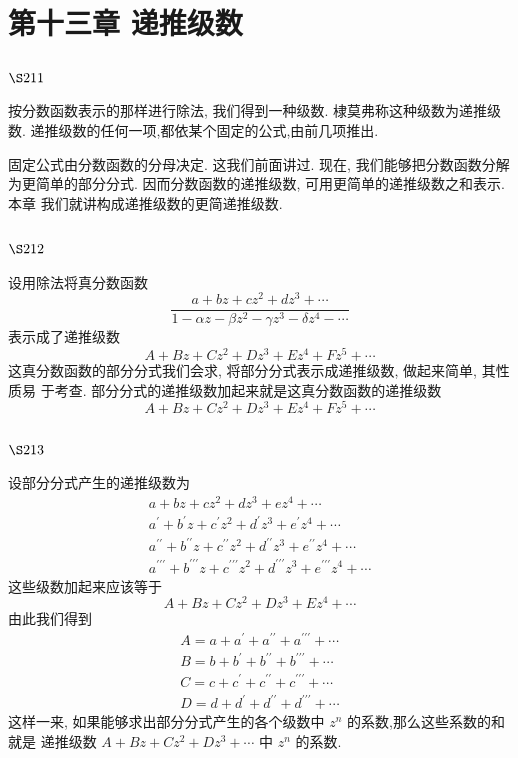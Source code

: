 \chapter{第十三章 递推级数}

\section{$\S 211$}

按分数函数表示的那样进行除法, 我们得到一种级数. 棣莫弗称这种级数为递推级 数. 递推级数的任何一项,都依某个固定的公式,由前几项推出.

固定公式由分数函数的分母决定. 这我们前面讲过. 现在, 我们能够把分数函数分解 为更简单的部分分式. 因而分数函数的递推级数, 可用更简单的递推级数之和表示. 本章 我们就讲构成递推级数的更简递推级数.

\section{$\S 212$}

设用除法将真分数函数
\[
\frac{a+b z+c z^{2}+d z^{3}+\cdots}{1-\alpha z-\beta z^{2}-\gamma z^{3}-\delta z^{4}-\cdots}
\]
表示成了递推级数
\[
A+B z+C z^{2}+D z^{3}+E z^{4}+F z^{5}+\cdots
\]
这真分数函数的部分分式我们会求, 将部分分式表示成递推级数, 做起来简单, 其性质易 于考查. 部分分式的递推级数加起来就是这真分数函数的递推级数
\[
A+B z+C z^{2}+D z^{3}+E z^{4}+F z^{5}+\cdots
\]
\section{$\S 213$}

设部分分式产生的递推级数为
\[
\begin{gathered}
a+b z+c z^{2}+d z^{3}+e z^{4}+\cdots \\
a^{\prime}+b^{\prime} z+c^{\prime} z^{2}+d^{\prime} z^{3}+e^{\prime} z^{4}+\cdots \\
a^{\prime \prime}+b^{\prime \prime} z+c^{\prime \prime} z^{2}+d^{\prime \prime} z^{3}+e^{\prime \prime} z^{4}+\cdots \\
a^{\prime \prime \prime}+b^{\prime \prime \prime} z+c^{\prime \prime \prime} z^{2}+d^{\prime \prime \prime} z^{3}+e^{\prime \prime \prime} z^{4}+\cdots
\end{gathered}
\]
这些级数加起来应该等于 
\[
A+B z+C z^{2}+D z^{3}+E z^{4}+\cdots
\]
由此我们得到
\[
\begin{gathered}
A=a+a^{\prime}+a^{\prime \prime}+a^{\prime \prime \prime}+\cdots \\
B=b+b^{\prime}+b^{\prime \prime}+b^{\prime \prime \prime}+\cdots \\
C=c+c^{\prime}+c^{\prime \prime}+c^{\prime \prime \prime}+\cdots \\
D=d+d^{\prime}+d^{\prime \prime}+d^{\prime \prime \prime}+\cdots
\end{gathered}
\]
这样一来, 如果能够求出部分分式产生的各个级数中 $z^{n}$ 的系数,那么这些系数的和就是 递推级数 $A+B z+C z^{2}+D z^{3}+\cdots$ 中 $z^{n}$ 的系数.

